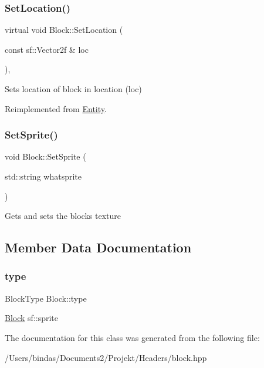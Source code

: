 \mbox{\label{class_block_a81095040d17d80f7cb3e7a67f4b2cea2}} 
\subsubsection{\texorpdfstring{SetLocation()}{SetLocation()}}
{\footnotesize\ttfamily virtual void Block\+::\+Set\+Location (\begin{DoxyParamCaption}\item[{const sf\+::\+Vector2f \&}]{loc }\end{DoxyParamCaption})\hspace{0.3cm}{\ttfamily [override]}, {\ttfamily [virtual]}}

Sets location of block in location (loc) 

Reimplemented from \mbox{\hyperlink{class_entity}{Entity}}.

\mbox{\label{class_block_ad6973b0ed9500d24a169434a4d0a3c23}} 
\subsubsection{\texorpdfstring{SetSprite()}{SetSprite()}}
{\footnotesize\ttfamily void Block\+::\+Set\+Sprite (\begin{DoxyParamCaption}\item[{std\+::string}]{whatsprite }\end{DoxyParamCaption})}

Gets and sets the block\textquotesingle{}s texture 

\subsection{Member Data Documentation}
\mbox{\label{class_block_a5a9ca25a0a1e718944de014be72554cc}} 
\subsubsection{\texorpdfstring{type}{type}}
{\footnotesize\ttfamily Block\+Type Block\+::type\hspace{0.3cm}{\ttfamily [private]}}

\mbox{\hyperlink{class_block}{Block}} sf\+::sprite 

The documentation for this class was generated from the following file\+:\begin{DoxyCompactItemize}
\item 
/\+Users/bindas/\+Documents2/\+Projekt/\+Headers/block.\+hpp\end{DoxyCompactItemize}
